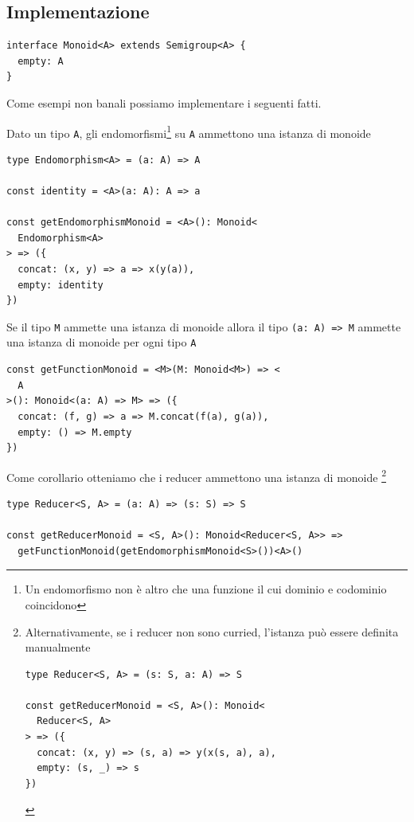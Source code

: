 \documentclass[12pt]{article}
\begin{document}
\subsection{Implementazione}

\begin{verbatim}
interface Monoid<A> extends Semigroup<A> {
  empty: A
}
\end{verbatim}

Come esempi non banali possiamo implementare i seguenti fatti.

Dato un tipo \texttt{A}, gli endomorfismi\footnote{Un endomorfismo non è altro che una funzione il cui dominio e codominio coincidono}
su \texttt{A} ammettono una istanza di monoide

\begin{verbatim}
type Endomorphism<A> = (a: A) => A

const identity = <A>(a: A): A => a

const getEndomorphismMonoid = <A>(): Monoid<
  Endomorphism<A>
> => ({
  concat: (x, y) => a => x(y(a)),
  empty: identity
})
\end{verbatim}

Se il tipo \texttt{M} ammette una istanza di monoide allora il tipo \texttt{(a: A) => M} ammette una istanza di monoide per ogni tipo \texttt{A}

\begin{verbatim}
const getFunctionMonoid = <M>(M: Monoid<M>) => <
  A
>(): Monoid<(a: A) => M> => ({
  concat: (f, g) => a => M.concat(f(a), g(a)),
  empty: () => M.empty
})
\end{verbatim}

Come corollario otteniamo che i reducer ammettono una istanza di monoide
\footnote{Alternativamente, se i reducer non sono curried, l'istanza può essere definita manualmente

\begin{verbatim}
type Reducer<S, A> = (s: S, a: A) => S

const getReducerMonoid = <S, A>(): Monoid<
  Reducer<S, A>
> => ({
  concat: (x, y) => (s, a) => y(x(s, a), a),
  empty: (s, _) => s
})
\end{verbatim}

}

\begin{verbatim}
type Reducer<S, A> = (a: A) => (s: S) => S

const getReducerMonoid = <S, A>(): Monoid<Reducer<S, A>> =>
  getFunctionMonoid(getEndomorphismMonoid<S>())<A>()
\end{verbatim}
\end{document}
